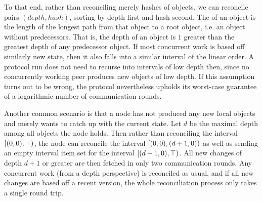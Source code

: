 To that end, rather than reconciling merely hashes of objects, we can reconcile pairs $(\mathit{depth}, \mathit{hash})$, sorting by depth first and hash second. The  of an object is the length of the longest path from that object to a root object, i.e. an object without predecessors. That is, the depth of an object is $1$ greater than the greatest depth of any predecessor object. If most concurrent work is based off similarly new state, then it also falls into a similar interval of the linear order. A protocol run does not need to recurse into intervals of low depth then, since no concurrently working peer produces new objects of low depth. If this assumption turns out to be wrong, the protocol nevertheless upholds its worst-case guarantee of a logarithmic number of communication rounds.

Another common scenario is that a node has not produced any new local objects and merely wants to catch up with the current state. Let $d$ be the maximal depth among all objects the node holds. Then rather than reconciling the interval $[{(0, 0)},{\top})_{}$, the node can reconcile the interval $[{(0, 0)},{(d + 1, 0)})_{}$ as well as sending an empty interval item set for the interval $[{(d + 1, 0)},{\top})_{}$. All new changes of depth $d + 1$ or greater are then fetched in only two communication rounds. Any concurrent work (from a depth perspective) is reconciled as usual, and if all new changes are based off a recent version, the whole reconciliation process only takes a single round trip.